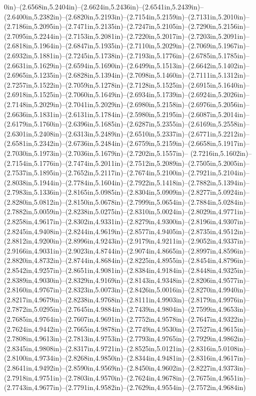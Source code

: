 0in)--(2.6568in,5.2404in)--(2.6624in,5.2436in)--(2.6541in,5.2439in)--(2.6400in,5.2382in)--(2.6820in,5.2193in)--(2.7154in,5.2159in)--(2.7131in,5.2010in)--(2.7186in,5.2095in)--(2.7471in,5.2135in)--(2.7247in,5.2105in)--(2.7290in,5.2156in)--(2.7095in,5.2244in)--(2.7153in,5.2081in)--(2.7220in,5.2017in)--(2.7203in,5.2091in)--(2.6818in,5.1964in)--(2.6847in,5.1935in)--(2.7110in,5.2029in)--(2.7069in,5.1967in)--(2.6932in,5.1881in)--(2.7245in,5.1738in)--(2.7193in,5.1776in)--(2.6785in,5.1785in)--(2.6631in,5.1629in)--(2.6594in,5.1690in)--(2.6499in,5.1513in)--(2.6642in,5.1402in)--(2.6965in,5.1235in)--(2.6828in,5.1394in)--(2.7098in,5.1460in)--(2.7111in,5.1312in)--(2.7257in,5.1522in)--(2.7059in,5.1278in)--(2.7128in,5.1525in)--(2.6915in,5.1640in)--(2.6918in,5.1525in)--(2.7060in,5.1649in)--(2.6934in,5.1739in)--(2.6924in,5.2026in)--(2.7148in,5.2029in)--(2.7041in,5.2029in)--(2.6980in,5.2158in)--(2.6976in,5.2056in)--(2.6636in,5.1831in)--(2.6131in,5.1784in)--(2.5980in,5.2195in)--(2.6087in,5.2014in)--(2.6179in,5.1760in)--(2.6396in,5.1685in)--(2.6287in,5.2355in)--(2.6169in,5.2558in)--(2.6301in,5.2408in)--(2.6313in,5.2489in)--(2.6510in,5.2337in)--(2.6771in,5.2212in)--(2.6581in,5.2342in)--(2.6736in,5.2484in)--(2.6759in,5.2159in)--(2.6658in,5.1917in)--(2.7030in,5.1973in)--(2.7036in,5.1679in)--(2.7202in,5.1557in)--
(2.7216in,5.1602in)--(2.7154in,5.1776in)--(2.7474in,5.2011in)--(2.7512in,5.2089in)--(2.7505in,5.2005in)--(2.7537in,5.1895in)--(2.7652in,5.2117in)--(2.7674in,5.2100in)--(2.7921in,5.2104in)--(2.8038in,5.1944in)--(2.7784in,5.1604in)--(2.7922in,5.1418in)--(2.7882in,5.1394in)--(2.7983in,5.1336in)--(2.8165in,5.0985in)--(2.8304in,5.0909in)--(2.8277in,5.0924in)--(2.8280in,5.0812in)--(2.8150in,5.0678in)--(2.7999in,5.0654in)--(2.7884in,5.0284in)--(2.7882in,5.0059in)--(2.8238in,5.0275in)--(2.8310in,5.0024in)--(2.8029in,4.9771in)--(2.8258in,4.9617in)--(2.8302in,4.9331in)--(2.8279in,4.9300in)--(2.8196in,4.9307in)--(2.8245in,4.9408in)--(2.8244in,4.9619in)--(2.8577in,4.9405in)--(2.8735in,4.9512in)--(2.8812in,4.9200in)--(2.8996in,4.9243in)--(2.9179in,4.9211in)--(2.9052in,4.9337in)--(2.9166in,4.9031in)--(2.9023in,4.8744in)--(2.9074in,4.8665in)--(2.8997in,4.8596in)--(2.8820in,4.8732in)--(2.8744in,4.8684in)--(2.8225in,4.8955in)--(2.8454in,4.8796in)--(2.8542in,4.9257in)--(2.8651in,4.9081in)--(2.8384in,4.9184in)--(2.8448in,4.9325in)--(2.8389in,4.9030in)--(2.8329in,4.9169in)--(2.8143in,4.9348in)--(2.8206in,4.9577in)--(2.8160in,4.9767in)--(2.8323in,5.0073in)--(2.8426in,5.0016in)--(2.8270in,4.9940in)--(2.8217in,4.9679in)--(2.8238in,4.9768in)--(2.8111in,4.9903in)--(2.8179in,4.9976in)--(2.7872in,5.0295in)--(2.7645in,4.9884in)--(2.7439in,4.9804in)--(2.7599in,4.9653in)--(2.7685in,4.9764in)--(2.7607in,4.9691in)--(2.7752in,4.9578in)--(2.7647in,4.9322in)--(2.7624in,4.9442in)--(2.7665in,4.9878in)--(2.7749in,4.9530in)--(2.7527in,4.9615in)--(2.7808in,4.9613in)--(2.7813in,4.9753in)--(2.7793in,4.9765in)--(2.7929in,4.9862in)--(2.8345in,4.9808in)--(2.8317in,4.9721in)--(2.8525in,5.0121in)--(2.8316in,5.0108in)--(2.8100in,4.9734in)--(2.8268in,4.9850in)--(2.8344in,4.9481in)--(2.8316in,4.9617in)--(2.8641in,4.9492in)--(2.8590in,4.9569in)--(2.8450in,4.9602in)--(2.8227in,4.9373in)--(2.7918in,4.9751in)--(2.7803in,4.9570in)--(2.7624in,4.9678in)--(2.7675in,4.9651in)--(2.7743in,4.9677in)--(2.7791in,4.9582in)--(2.7629in,4.9554in)--(2.7572in,4.9684in)
